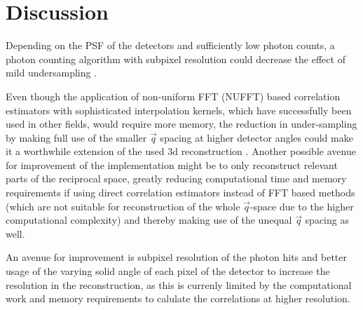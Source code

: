 \chapter{Discussion}

Depending on the PSF of the detectors and sufficiently low photon counts, a photon counting algorithm with subpixel resolution could decrease the effect of mild undersampling \cite{sun2020}.


Even though the application of non-uniform FFT (NUFFT) based correlation estimators with sophisticated interpolation kernels, which have  successfully been used in other fields, would require more memory, the reduction in under-sampling by making full use of the smaller $\vec{q}$ spacing at higher detector angles could make it a worthwhile extension of the used 3d reconstruction \cite{laguna1998,yang2008,chang2020}. Another possible avenue for improvement of the implementation might be to only reconstruct relevant parts of the reciprocal space, greatly reducing computational time and memory requirements if using direct correlation estimators instead of FFT based methods (which are not suitable for reconstruction of the whole $\vec{q}$-space due to the higher computational complexity) and thereby making use of the unequal $\vec{q}$ spacing as well.



An avenue for improvement is subpixel resolution of the photon hits and better usage of the varying solid angle of each pixel of the detector to increase the resolution in the reconstruction, as this is currenly limited by the computational work and memory requirements to calulate the correlations at higher resolution.


